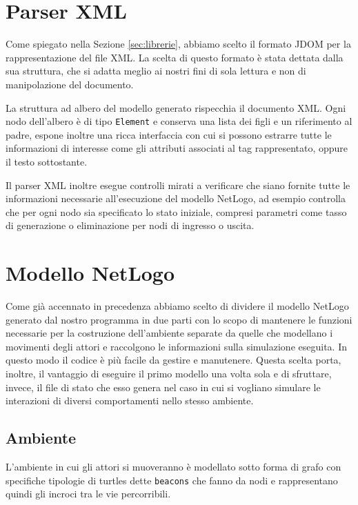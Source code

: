 \section{Parser XML}
\label{subsec:parser-builder}

Come spiegato nella Sezione \ref{sec:librerie}, abbiamo scelto il formato JDOM per la rappresentazione del file XML. La scelta di questo formato è stata dettata dalla sua struttura, che si adatta meglio ai nostri fini di sola lettura e non di manipolazione del documento.

La struttura ad albero del modello generato rispecchia il documento XML. Ogni nodo dell'albero è di tipo \texttt{Element} e conserva una lista dei figli e un riferimento al padre, espone inoltre una ricca interfaccia con cui si possono estrarre tutte le informazioni di interesse come gli attributi associati al tag rappresentato, oppure il testo sottostante.

Il parser XML inoltre esegue controlli mirati a verificare che siano fornite tutte le informazioni necessarie all'esecuzione del modello NetLogo, ad esempio controlla che per ogni nodo sia specificato lo stato iniziale, compresi parametri come tasso di generazione o eliminazione per nodi di ingresso o uscita.


\section{Modello NetLogo}
\label{sec:modello-netlogo}

Come già accennato in precedenza abbiamo scelto di dividere il modello NetLogo generato dal nostro programma in due parti con lo scopo di mantenere le funzioni necessarie per la costruzione dell'ambiente separate da quelle che modellano i movimenti degli attori e raccolgono le informazioni sulla simulazione eseguita. In questo modo il codice è più facile da gestire e manutenere. Questa scelta porta, inoltre, il vantaggio di eseguire il primo modello una volta sola e di sfruttare, invece, il file di stato che esso genera nel caso in cui si vogliano simulare le interazioni di diversi comportamenti nello stesso ambiente.
\subsection{Ambiente}
L'ambiente in cui gli attori si muoveranno è modellato sotto forma di grafo con specifiche tipologie di turtles dette \texttt{beacons} che fanno da nodi e rappresentano quindi gli incroci tra le vie percorribili.

